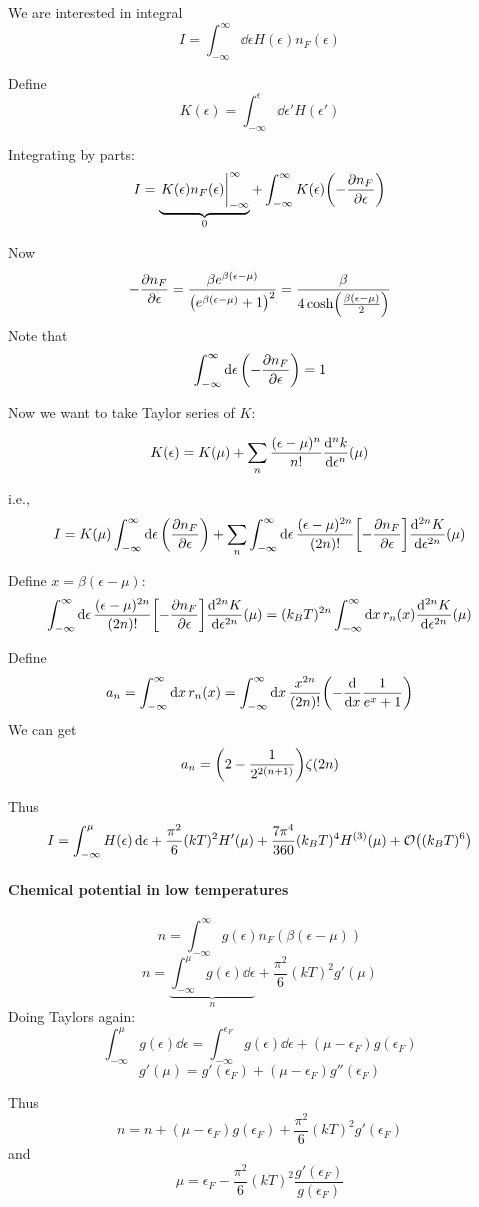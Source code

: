We are interested in integral
$$I = \int_{-\infty}^{\infty} \dd{\epsilon} H(\epsilon) n_F(\epsilon) $$

Define
$$K(\epsilon) = \int_{-\infty}^{\epsilon} \dd{\epsilon'} H(\epsilon') $$

Integrating by parts:
$$I = \underbrace{\eval{K(\epsilon ) n_F(\epsilon)}_{-\infty}^{\infty}}_{0} +\int_{-\infty}^\infty K(\epsilon) \qty(-\pdv{n_F}{\epsilon}) $$

Now
$$-\pdv{n_F}{\epsilon} = \frac{\beta e^{\beta\qty(\epsilon-\mu)}}{\qty( e^{\beta\qty(\epsilon-\mu)}+1)^2} = \frac{\beta}{4\cosh(\frac{\beta(\epsilon-\mu)}{2})}$$
Note that
$$\int_{-\infty}^\infty \dd{\epsilon} \qty(-\pdv{n_F}{\epsilon}) =1$$

Now we want to take Taylor series of $K$:

$$K(\epsilon) = K(\mu) + \sum_n \frac{(\epsilon-\mu)^n}{n!} \dv[n]{k}{\epsilon} \qty(\mu)$$

i.e.,
$$I = K(\mu)\int_{-\infty}^\infty \dd{\epsilon} \qty(\pdv{n_F}{\epsilon}) + \sum_n \int_{-\infty}^\infty \dd{\epsilon}  \frac{(\epsilon-\mu)^{2n}}{(2n)!} \qty[-\pdv{n_F}{\epsilon}] \dv[2n]{K}{\epsilon} \qty(\mu)$$

Define $x=\beta(\epsilon-\mu)$:
$$\int_{-\infty}^\infty \dd{\epsilon}  \frac{(\epsilon-\mu)^{2n}}{(2n)!} \qty[-\pdv{n_F}{\epsilon}] \dv[2n]{K}{\epsilon} \qty(\mu) = (k_BT)^{2n}\int_{-\infty}^\infty \dd{x} r_n(x) \dv[2n]{K}{\epsilon} \qty(\mu)$$

Define
$$a_n = \int_{-\infty}^\infty \dd{x} r_n(x) = \int_{-\infty}^\infty \dd{x} \frac{x^{2n}}{(2n)!} \qty(-\dv{x} \frac{1}{e^x+1})$$
We can get
$$a_n = \qty(2-\frac{1}{2^{2(n+1)}}) \zeta(2n)$$


Thus
$$I = \int_{-\infty}^\mu H(\epsilon) \dd{\epsilon} + \frac{\pi^2}{6} (kT)^2 H'(\mu) + \frac{7\pi^4}{360} (k_BT)^4 H^{(3)} (\mu) + \order{(k_BT)^6} $$

\paragraph{Chemical potential in low temperatures}
$$n = \int_{-\infty}^\infty g(\epsilon) n_F(\beta(\epsilon-\mu))$$
$$n = \underbrace{\int_{-\infty}^\mu g(\epsilon) \dd{\epsilon}}_{n} + \frac{\pi^2}{6} (kT)^2 g'(\mu)$$
Doing Taylors again:
$$\int_{-\infty}^\mu g(\epsilon) \dd{\epsilon} = \int_{-\infty}^{\epsilon_F} g(\epsilon) \dd{\epsilon} + (\mu-\epsilon_F) g(\epsilon_F)$$
$$g'(\mu) = g'(\epsilon_F) + (\mu-\epsilon_F) g''(\epsilon_F)$$

Thus
$$n = n + (\mu-\epsilon_F) g(\epsilon_F) + \frac{\pi^2}{6} (kT)^2 g'(\epsilon_F)$$
and
$$\mu = \epsilon_F - \frac{\pi^2}{6} (kT)^2 \frac{g'(\epsilon_F)}{g(\epsilon_F)} $$

